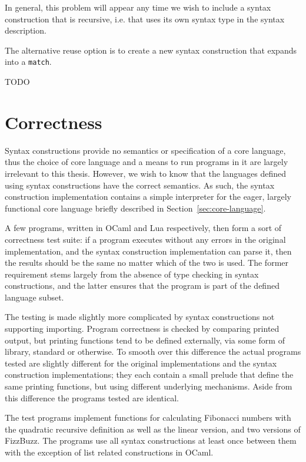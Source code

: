 \documentclass{kththesis}
\begin{document}
In general, this problem will appear any time we wish to include a syntax construction that is recursive, i.e. that uses its own syntax type in the syntax description. %

The alternative reuse option is to create a new syntax construction that expands into a \texttt{match}.

TODO

\section{Correctness} \label{sec:correctness-and-performance}

Syntax constructions provide no semantics or specification of a core language, thus the choice of core language and a means to run programs in it are largely irrelevant to this thesis. However, we wish to know that the languages defined using syntax constructions have the correct semantics. As such, the syntax construction implementation contains a simple interpreter for the eager, largely functional core language briefly described in Section~\ref{sec:core-language}.

A few programs, written in OCaml and Lua respectively, then form a sort of correctness test suite: if a program executes without any errors in the original implementation, and the syntax construction implementation can parse it, then the results should be the same no matter which of the two is used. The former requirement stems largely from the absence of type checking in syntax constructions, and the latter ensures that the program is part of the defined language subset.

The testing is made slightly more complicated by syntax constructions not supporting importing. Program correctness is checked by comparing printed output, but printing functions tend to be defined externally, via some form of library, standard or otherwise. To smooth over this difference the actual programs tested are slightly different for the original implementations and the syntax construction implementations; they each contain a small prelude that define the same printing functions, but using different underlying mechanisms. Aside from this difference the programs tested are identical.

The test programs implement functions for calculating Fibonacci numbers with the quadratic recursive definition as well as the linear version, and two versions of FizzBuzz. The programs use all syntax constructions at least once between them with the exception of list related constructions in OCaml.
\end{document}
